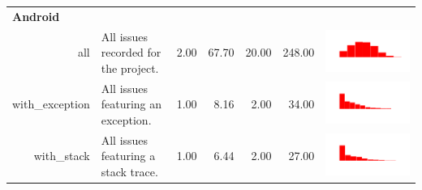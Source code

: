 \begin{table}[ht]
\begin{tabular}{rp{27em}rrrrc}
   \hline
   \multicolumn{2}{l}{\bfseries{Android}}\\
   all & All issues recorded for the project. & 2.00 & 67.70 & 20.00 & 248.00 & \includegraphics[scale = 0.08, clip = true, trim= 50px 70px 50px 60px]{hist-5d4a87daa44c63097df9bb1f3506d541.pdf} \\ 
  with\_exception & All issues featuring an exception. & 1.00 & 8.16 & 2.00 & 34.00 & \includegraphics[scale = 0.08, clip = true, trim= 50px 70px 50px 60px]{hist-bf73235d0503f937ef6f36c28cf1ba0d.pdf} \\ 
  with\_stack & All issues featuring a stack trace. & 1.00 & 6.44 & 2.00 & 27.00 & \includegraphics[scale = 0.08, clip = true, trim= 50px 70px 50px 60px]{hist-528cb6be67074e6e2c22d11245920e13.pdf} \\ 

\end{tabular}
\end{table}
